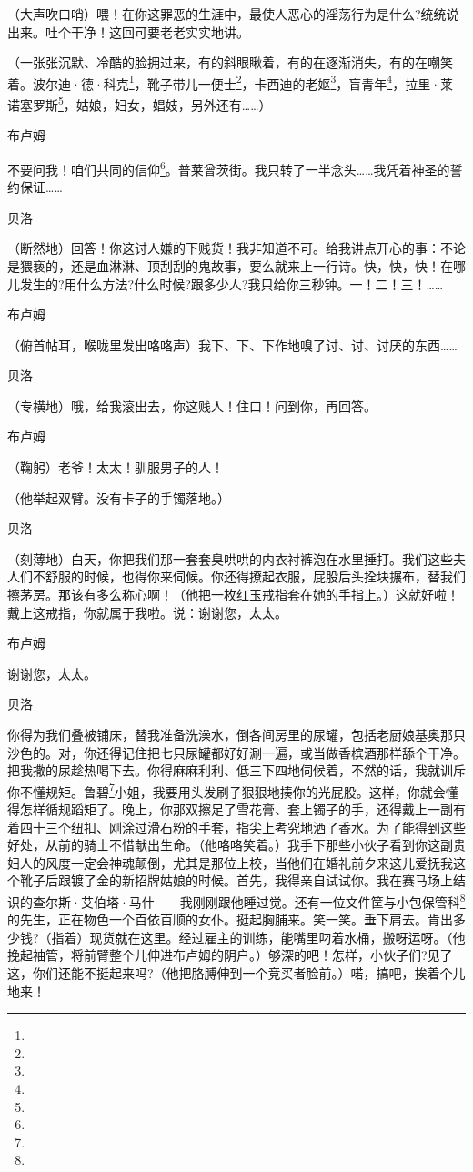 \par （大声吹口哨）喂！在你这罪恶的生涯中，最使人恶心的淫荡行为是什么?统统说出来。吐个干净！这回可要老老实实地讲。
\par （一张张沉默、冷酷的脸拥过来，有的斜眼瞅着，有的在逐渐消失，有的在嘲笑着。波尔迪·德·科克\footnote{}，靴子带儿一便士\footnote{}，卡西迪的老妪\footnote{}，盲青年\footnote{}，拉里·莱诺塞罗斯\footnote{}，姑娘，妇女，娼妓，另外还有……）
\par 布卢姆
\par 不要问我！咱们共同的信仰\footnote{}。普莱曾茨街。我只转了一半念头……我凭着神圣的誓约保证……
\par 贝洛
\par （断然地）回答！你这讨人嫌的下贱货！我非知道不可。给我讲点开心的事：不论是猥亵的，还是血淋淋、顶刮刮的鬼故事，要么就来上一行诗。快，快，快！在哪儿发生的?用什么方法?什么时候?跟多少人?我只给你三秒钟。一！二！三！……
\par 布卢姆
\par （俯首帖耳，喉咙里发出咯咯声）我下、下、下作地嗅了讨、讨、讨厌的东西……
\par 贝洛
\par （专横地）哦，给我滚出去，你这贱人！住口！问到你，再回答。
\par 布卢姆
\par （鞠躬）老爷！太太！驯服男子的人！
\par （他举起双臂。没有卡子的手镯落地。）
\par 贝洛
\par （刻薄地）白天，你把我们那一套套臭哄哄的内衣衬裤泡在水里捶打。我们这些夫人们不舒服的时候，也得你来伺候。你还得撩起衣服，屁股后头拴块搌布，替我们擦茅房。那该有多么称心啊！（他把一枚红玉戒指套在她的手指上。）这就好啦！戴上这戒指，你就属于我啦。说：谢谢您，太太。
\par 布卢姆
\par 谢谢您，太太。
\par 贝洛
\par 你得为我们叠被铺床，替我准备洗澡水，倒各间房里的尿罐，包括老厨娘基奥那只沙色的。对，你还得记住把七只尿罐都好好涮一遍，或当做香槟酒那样舔个干净。把我撒的尿趁热喝下去。你得麻麻利利、低三下四地伺候着，不然的话，我就训斥你不懂规矩。鲁碧\footnote{}小姐，我要用头发刷子狠狠地揍你的光屁股。这样，你就会懂得怎样循规蹈矩了。晚上，你那双擦足了雪花膏、套上镯子的手，还得戴上一副有着四十三个纽扣、刚涂过滑石粉的手套，指尖上考究地洒了香水。为了能得到这些好处，从前的骑士不惜献出生命。（他咯咯笑着。）我手下那些小伙子看到你这副贵妇人的风度一定会神魂颠倒，尤其是那位上校，当他们在婚礼前夕来这儿爱抚我这个靴子后跟镀了金的新招牌姑娘的时候。首先，我得亲自试试你。我在赛马场上结识的查尔斯·艾伯塔·马什——我刚刚跟他睡过觉。还有一位文件筐与小包保管科\footnote{}的先生，正在物色一个百依百顺的女仆。挺起胸脯来。笑一笑。垂下肩去。肯出多少钱?（指着）现货就在这里。经过雇主的训练，能嘴里叼着水桶，搬呀运呀。（他挽起袖管，将前臂整个儿伸进布卢姆的阴户。）够深的吧！怎样，小伙子们?见了这，你们还能不挺起来吗?（他把胳膊伸到一个竞买者脸前。）喏，搞吧，挨着个儿地来！
